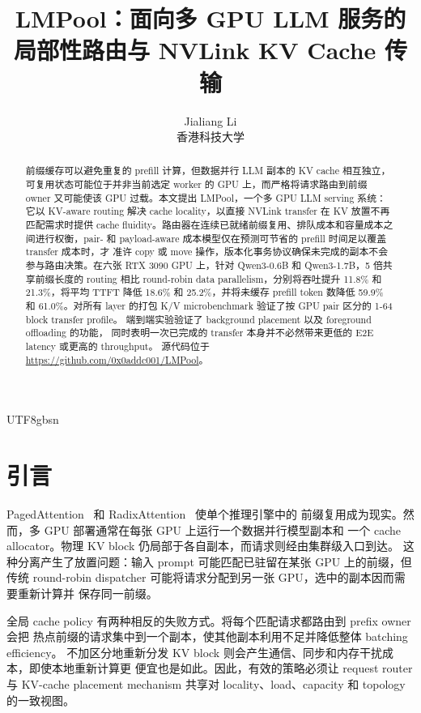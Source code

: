 \documentclass[11pt,a4paper]{article}
\title{LMPool：面向多 GPU LLM 服务的局部性路由与 NVLink KV Cache 传输}
\author{Jialiang Li\\香港科技大学}
\date{}
\newcommand{\sys}{LMPool}
\begin{document}
\ifXeTeX\else\begin{CJK*}{UTF8}{gbsn}\fi
\maketitle

\begin{abstract}
前缀缓存可以避免重复的 prefill 计算，但数据并行 LLM 副本的 KV cache 相互独立，
可复用状态可能位于并非当前选定 worker 的 GPU 上，而严格将请求路由到前缀 owner
又可能使该 GPU 过载。本文提出 \sys{}，一个多 GPU LLM serving 系统：它以 KV-aware
routing 解决 cache locality，以直接 NVLink transfer 在 KV 放置不再匹配需求时提供
cache fluidity。路由器在连续已就绪前缀复用、排队成本和容量成本之间进行权衡，pair-
和 payload-aware 成本模型仅在预测可节省的 prefill 时间足以覆盖 transfer 成本时，才
准许 copy 或 move 操作，版本化事务协议确保未完成的副本不会参与路由决策。在六张
RTX 3090 GPU 上，针对 Qwen3-0.6B 和 Qwen3-1.7B，5 倍共享前缀长度的 routing 相比
round-robin data parallelism，分别将吞吐提升 11.8\% 和 21.3\%，将平均 TTFT 降低
18.6\% 和 25.2\%，并将未缓存 prefill token 数降低 59.9\% 和 61.0\%。对所有 layer
的打包 K/V microbenchmark 验证了按 GPU pair 区分的 1-64 block transfer profile。
端到端实验验证了 background placement 以及 foreground offloading 的功能，
同时表明一次已完成的 transfer 本身并不必然带来更低的 E2E latency 或更高的 throughput。
源代码位于 \url{https://github.com/0x0addc001/LMPool}。
\end{abstract}

\section{引言}

PagedAttention~\citep{vLLM} 和 RadixAttention~\citep{SGLang} 使单个推理引擎中的
前缀复用成为现实。然而，多 GPU 部署通常在每张 GPU 上运行一个数据并行模型副本和
一个 cache allocator。物理 KV block 仍局部于各自副本，而请求则经由集群级入口到达。
这种分离产生了放置问题：输入 prompt 可能匹配已驻留在某张 GPU 上的前缀，但传统
round-robin dispatcher 可能将请求分配到另一张 GPU，选中的副本因而需要重新计算并
保存同一前缀。

全局 cache policy 有两种相反的失败方式。将每个匹配请求都路由到 prefix owner 会把
热点前缀的请求集中到一个副本，使其他副本利用不足并降低整体 batching efficiency。
不加区分地重新分发 KV block 则会产生通信、同步和内存干扰成本，即使本地重新计算更
便宜也是如此。因此，有效的策略必须让 request router 与 KV-cache placement mechanism
共享对 locality、load、capacity 和 topology 的一致视图。


\end{CJK*}
\end{document}
